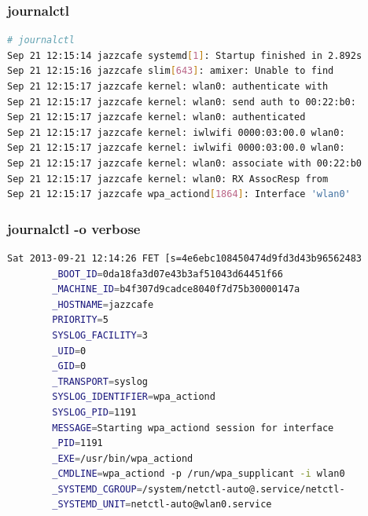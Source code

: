 \documentclass[aspectratio=169]{beamer}
\begin{document}
\begin{frame}[fragile]
  \frametitle{journalctl}
  
  \begin{lstlisting}[language=sh]
# journalctl
Sep 21 12:15:14 jazzcafe systemd[1]: Startup finished in 2.892s
Sep 21 12:15:16 jazzcafe slim[643]: amixer: Unable to find
Sep 21 12:15:17 jazzcafe kernel: wlan0: authenticate with
Sep 21 12:15:17 jazzcafe kernel: wlan0: send auth to 00:22:b0:
Sep 21 12:15:17 jazzcafe kernel: wlan0: authenticated
Sep 21 12:15:17 jazzcafe kernel: iwlwifi 0000:03:00.0 wlan0:
Sep 21 12:15:17 jazzcafe kernel: iwlwifi 0000:03:00.0 wlan0:
Sep 21 12:15:17 jazzcafe kernel: wlan0: associate with 00:22:b0
Sep 21 12:15:17 jazzcafe kernel: wlan0: RX AssocResp from
Sep 21 12:15:17 jazzcafe wpa_actiond[1864]: Interface 'wlan0'
\end{lstlisting}

\end{frame}


\begin{frame}[fragile]
  \frametitle{journalctl -o verbose}
  
  \begin{lstlisting}[language=sh]
Sat 2013-09-21 12:14:26 FET [s=4e6ebc108450474d9fd3d43b96562483
        _BOOT_ID=0da18fa3d07e43b3af51043d64451f66
        _MACHINE_ID=b4f307d9cadce8040f7d75b30000147a
        _HOSTNAME=jazzcafe
        PRIORITY=5
        SYSLOG_FACILITY=3
        _UID=0
        _GID=0
        _TRANSPORT=syslog
        SYSLOG_IDENTIFIER=wpa_actiond
        SYSLOG_PID=1191
        MESSAGE=Starting wpa_actiond session for interface
        _PID=1191
        _EXE=/usr/bin/wpa_actiond
        _CMDLINE=wpa_actiond -p /run/wpa_supplicant -i wlan0
        _SYSTEMD_CGROUP=/system/netctl-auto@.service/netctl-
        _SYSTEMD_UNIT=netctl-auto@wlan0.service
\end{lstlisting}

\end{frame}
\end{document}
